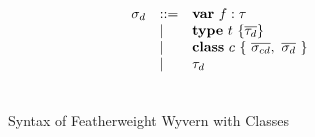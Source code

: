 \begin{figure*}
\[\begin{array}{ccc}
\begin{array}{lll}
\sigma_d  & ::= & \textbf{var}~ f : \tau \\
     & \mathrel{\mid} & \textbf{type}~ t ~ \{\overline{\tau_d}\} \\
     & \mathrel{\mid} & \textbf{class}~ c ~ \{ ~ \overline{\sigma_{cd}}, ~ \overline{\sigma_d} ~ \} \\
     & \mathrel{\mid} & \tau_d \\
\\[1ex]
\end{array}

\end{array}
\]
\caption{Syntax of Featherweight Wyvern with Classes}
\label{f-core3-syntax}
\end{figure*}
